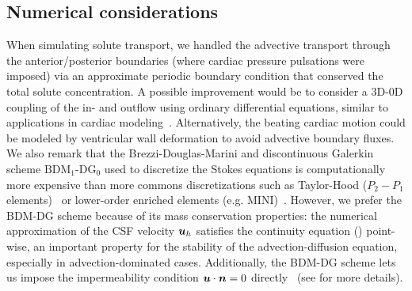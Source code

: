 \documentclass{WileyMSP-template}
\begin{document}
\subsection{Numerical considerations}
When simulating solute transport, we handled the advective transport
through the anterior/posterior boundaries
(where cardiac pressure pulsations were imposed)
via an approximate periodic boundary condition
that conserved the total solute concentration.
A possible improvement would be
to consider a 3D-0D coupling of the in- and outflow using
ordinary differential equations,
similar to applications in cardiac
modeling~\cite{Brown2024AMechanics, Augustin2021ACirculation}.
Alternatively, the beating cardiac motion could be modeled by ventricular wall deformation to avoid advective boundary fluxes\cite{Causemann2022HumanFramework,
Kurtcuoglu2005ComputationalSystem, Kurtcuoglu2007ComputationalSylvius, Linninger2005PulsatileBrain}.
%
We also remark that the Brezzi-Douglas-Marini and discontinuous Galerkin scheme
$\mathrm{BDM}_1$-$\mathrm{DG}_0$
used to discretize the Stokes equations
is computationally more expensive
than more commons discretizations such as 
Taylor-Hood ($P_2-P_{1}$ elements)~\cite{Stenberg1990ErrorProblem} or lower-order enriched
elements (e.g. MINI)~\cite{Brezzi2011MixedMethods}.
However, we prefer the BDM-DG scheme because of its mass conservation properties: the numerical approximation of
the CSF velocity $\bm{u}_h$ satisfies the continuity equation () point-wise, an important property for the stability of the advection-diffusion
equation, especially in advection-dominated cases.
\cite{cesmelioglu2022compatible, johnson2009numerical, gresho1998incompressible}
Additionally, the BDM-DG scheme 
lets us impose the impermeability condition $\bm{u}\cdot\bm{n}=0$
directly~\cite{Brezzi1985TwoProblems} (see  for more details).
\end{document}

